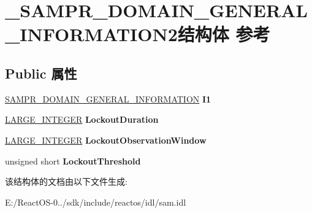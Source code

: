 \hypertarget{struct___s_a_m_p_r___d_o_m_a_i_n___g_e_n_e_r_a_l___i_n_f_o_r_m_a_t_i_o_n2}{}\section{\+\_\+\+S\+A\+M\+P\+R\+\_\+\+D\+O\+M\+A\+I\+N\+\_\+\+G\+E\+N\+E\+R\+A\+L\+\_\+\+I\+N\+F\+O\+R\+M\+A\+T\+I\+O\+N2结构体 参考}
\label{struct___s_a_m_p_r___d_o_m_a_i_n___g_e_n_e_r_a_l___i_n_f_o_r_m_a_t_i_o_n2}
\subsection*{Public 属性}
\begin{DoxyCompactItemize}
\item 
\mbox{\label{struct___s_a_m_p_r___d_o_m_a_i_n___g_e_n_e_r_a_l___i_n_f_o_r_m_a_t_i_o_n2_aa45b6822aa95ca59e04008f5b18a684d}} 
\hyperlink{struct___s_a_m_p_r___d_o_m_a_i_n___g_e_n_e_r_a_l___i_n_f_o_r_m_a_t_i_o_n}{S\+A\+M\+P\+R\+\_\+\+D\+O\+M\+A\+I\+N\+\_\+\+G\+E\+N\+E\+R\+A\+L\+\_\+\+I\+N\+F\+O\+R\+M\+A\+T\+I\+ON} {\bfseries I1}
\item 
\mbox{\label{struct___s_a_m_p_r___d_o_m_a_i_n___g_e_n_e_r_a_l___i_n_f_o_r_m_a_t_i_o_n2_a7519a0bf912d89149d76dba770b01b19}} 
\hyperlink{union___l_a_r_g_e___i_n_t_e_g_e_r}{L\+A\+R\+G\+E\+\_\+\+I\+N\+T\+E\+G\+ER} {\bfseries Lockout\+Duration}
\item 
\mbox{\label{struct___s_a_m_p_r___d_o_m_a_i_n___g_e_n_e_r_a_l___i_n_f_o_r_m_a_t_i_o_n2_a0e2c60e201ba5990b82bddb2ad22c8fa}} 
\hyperlink{union___l_a_r_g_e___i_n_t_e_g_e_r}{L\+A\+R\+G\+E\+\_\+\+I\+N\+T\+E\+G\+ER} {\bfseries Lockout\+Observation\+Window}
\item 
\mbox{\label{struct___s_a_m_p_r___d_o_m_a_i_n___g_e_n_e_r_a_l___i_n_f_o_r_m_a_t_i_o_n2_ac712ab5f407b1eed6d3daeb825d7a5a6}} 
unsigned short {\bfseries Lockout\+Threshold}
\end{DoxyCompactItemize}


该结构体的文档由以下文件生成\+:\begin{DoxyCompactItemize}
\item 
E\+:/\+React\+O\+S-\/0../sdk/include/reactos/idl/sam.\+idl\end{DoxyCompactItemize}
